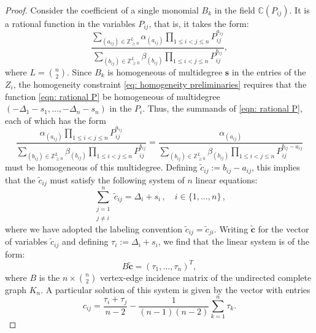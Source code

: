 \documentclass[12pt,a4paper]{extarticle}
\theoremstyle{definition}
\begin{document}
\begin{proof}
    Consider the coefficient of a single monomial $B_k$ in the field $\mathbb{C}(P_{ij})$. 
    It is a rational function in the variables $P_{ij}$, that is, it takes the form:
    \begin{equation}\label{eqn: rational P}
    \dfrac{\sum\limits_{(a_{ij})\in\mathbb{Z}_{\geq 0}^L}\alpha_{(a_{ij})}\prod\limits_{1\leq i<j\leq n} P_{ij}^{a_{ij}}}{\sum\limits_{(b_{ij})\in\mathbb{Z}_{\geq 0}^L}\beta_{(b_{ij})}\prod\limits_{1\leq i<j\leq n} P_{ij}^{b_{ij}}},
    \end{equation}
    where $L=\binom{n}{2}$.
    Since $B_k$ is homogeneous of multidegree $\mathbf{s}$ in the entries of the $Z_i$, the homogeneity constraint \eqref{eq: homogeneity preliminaries} requires that the function \eqref{eqn: rational P} be homogeneous of multidegree $(-\Delta_1-s_1,\ldots,-\Delta_n-s_n)$ in the $P_i$. Thus, the summands of \eqref{eqn: rational P}, each of which has the form
    \begin{equation*}
        \dfrac{\alpha_{(a_{ij})}\prod\limits_{1\leq i<j\leq n} P_{ij}^{a_{ij}}}{\sum\limits_{(b_{ij})\in\mathbb{Z}_{\geq 0}^L}\beta_{(b_{ij})}\prod\limits_{1\leq i<j\leq n} P_{ij}^{b_{ij}}} = \dfrac{\alpha_{(a_{ij})}}{\sum\limits_{(b_{ij})\in\mathbb{Z}_{\geq 0}^L}\beta_{(b_{ij})}\prod\limits_{1\leq i<j\leq n} P_{ij}^{b_{ij}-a_{ij}}}
    \end{equation*}
    must be homogeneous of this multidegree. Defining $\tilde{c}_{ij}:=b_{ij}-a_{ij}$, this implies that the $\tilde{c}_{ij}$ must satisfy the following system of $n$ linear equations:
    \begin{equation*}
        \sum_{\substack{j=1\\j\neq i}}^n\tilde{c}_{ij}=\Delta_i+s_i\,, \quad i\in\{1,\ldots,n\}\,,
    \end{equation*}
    where we have adopted the labeling convention $\tilde{c}_{ij}=\tilde{c}_{ji}$. Writing $\tilde{\mathbf{c}}$ for the vector of variables $\tilde{c}_{ij}$ and defining $\tau_i:=\Delta_i+s_i$, we find that the linear system is of the form:
    \begin{equation*}
        B\tilde{\mathbf{c}}=(\tau_1,\ldots,\tau_n)^T,
    \end{equation*}
    where $B$ is the $n\times\binom{n}{2}$ vertex-edge incidence matrix of the undirected complete graph $K_n$. A particular solution of this system is given by the vector with entries
    \begin{equation*}
        c_{ij}= \dfrac{\tau_i+\tau_j}{n-2}-\dfrac{1}{(n-1)(n-2)}\sum\limits_{k=1}^n \tau_k.

\end{equation*}
\end{proof}
\end{document}
